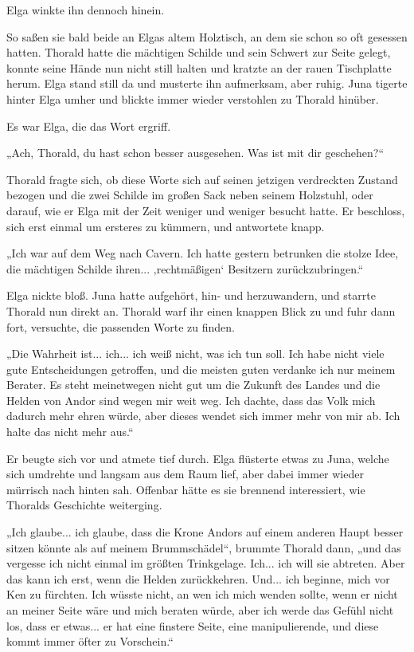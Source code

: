 \documentclass[10pt, a4paper, oneside]{book}
\begin{document}
Elga winkte ihn dennoch hinein.\bigskip







So saßen sie bald beide an Elgas altem Holztisch, an dem sie schon so oft gesessen hatten. Thorald hatte die mächtigen Schilde und sein Schwert zur Seite gelegt, konnte seine Hände nun nicht still halten und kratzte an der rauen Tischplatte herum. Elga stand still da und musterte ihn aufmerksam, aber ruhig. Juna tigerte hinter Elga umher und blickte immer wieder verstohlen zu Thorald hinüber.

Es war Elga, die das Wort ergriff.

„Ach, Thorald, du hast schon besser ausgesehen. Was ist mit dir geschehen?“

Thorald fragte sich, ob diese Worte sich auf seinen jetzigen verdreckten Zustand bezogen und die zwei Schilde im großen Sack neben seinem Holzstuhl, oder darauf, wie er Elga mit der Zeit weniger und weniger besucht hatte. Er beschloss, sich erst einmal um ersteres zu kümmern, und antwortete knapp.

„Ich war auf dem Weg nach Cavern. Ich hatte gestern betrunken die stolze Idee, die mächtigen Schilde ihren... ‚rechtmäßigen‘ Besitzern zurückzubringen.“

Elga nickte bloß. Juna hatte aufgehört, hin- und herzuwandern, und starrte Thorald nun direkt an. Thorald warf ihr einen knappen Blick zu und fuhr dann fort, versuchte, die passenden Worte zu finden.

„Die Wahrheit ist... ich... ich weiß nicht, was ich tun soll. Ich habe nicht viele gute Entscheidungen getroffen, und die meisten guten verdanke ich nur meinem Berater. Es steht meinetwegen nicht gut um die Zukunft des Landes und die Helden von Andor sind wegen mir weit weg. Ich dachte, dass das Volk mich dadurch mehr ehren würde, aber dieses wendet sich immer mehr von mir ab. Ich halte das nicht mehr aus.“

Er beugte sich vor und atmete tief durch. Elga flüsterte etwas zu Juna, welche sich umdrehte und langsam aus dem Raum lief, aber dabei immer wieder mürrisch nach hinten sah. Offenbar hätte es sie brennend interessiert, wie Thoralds Geschichte weiterging.

„Ich glaube... ich glaube, dass die Krone Andors auf einem anderen Haupt besser sitzen könnte als auf meinem Brummschädel“, brummte Thorald dann, „und das vergesse ich nicht einmal im größten Trinkgelage. Ich... ich will sie abtreten. Aber das kann ich erst, wenn die Helden zurückkehren. Und... ich beginne, mich vor Ken zu fürchten. Ich wüsste nicht, an wen ich mich wenden sollte, wenn er nicht an meiner Seite wäre und mich beraten würde, aber ich werde das Gefühl nicht los, dass er etwas... er hat eine finstere Seite, eine manipulierende, und diese kommt immer öfter zu Vorschein.“
\end{document}
